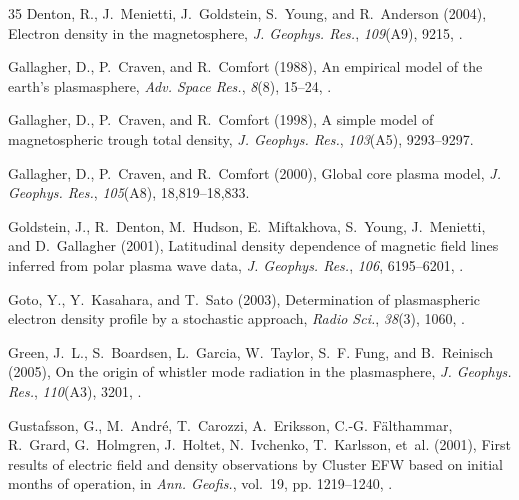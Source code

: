 \documentclass[a4paper]{article}
\renewenvironment{thebibliography}[1]{\begin{oldthebibliography}{#1}\setlength{\parskip}{0ex}\setlength{\itemsep}{0ex}}{\end{oldthebibliography}}
\begin{document}
\begin{thebibliography}{35}
Denton, R., J.~Menietti, J.~Goldstein, S.~Young, and R.~Anderson (2004),
  Electron density in the magnetosphere, \textit{J. Geophys. Res.},
  \textit{109}(A9), 9215, .

Gallagher, D., P.~Craven, and R.~Comfort (1988), An empirical model of the
  earth's plasmasphere, \textit{Adv. Space Res.}, \textit{8}(8), 15--24,
  .

Gallagher, D., P.~Craven, and R.~Comfort (1998), A simple model of
  magnetospheric trough total density, \textit{J. Geophys. Res.},
  \textit{103}(A5), 9293--9297.

Gallagher, D., P.~Craven, and R.~Comfort (2000), Global core plasma model,
  \textit{J. Geophys. Res.}, \textit{105}(A8), 18,819--18,833.

Goldstein, J., R.~Denton, M.~Hudson, E.~Miftakhova, S.~Young, J.~Menietti, and
  D.~Gallagher (2001), Latitudinal density dependence of magnetic field lines
  inferred from polar plasma wave data, \textit{J. Geophys. Res.},
  \textit{106}, 6195--6201, .

Goto, Y., Y.~Kasahara, and T.~Sato (2003), Determination of plasmaspheric
  electron density profile by a stochastic approach, \textit{Radio Sci.},
  \textit{38}(3), 1060, .

Green, J.~L., S.~Boardsen, L.~Garcia, W.~Taylor, S.~F. Fung, and B.~Reinisch
  (2005), On the origin of whistler mode radiation in the plasmasphere,
  \textit{J. Geophys. Res.}, \textit{110}(A3), 3201,
  .

Gustafsson, G., M.~Andr{\'e}, T.~Carozzi, A.~Eriksson, C.-G. F{\"a}lthammar,
  R.~Grard, G.~Holmgren, J.~Holtet, N.~Ivchenko, T.~Karlsson, et~al. (2001),
  First results of electric field and density observations by {Cluster} {EFW}
  based on initial months of operation, in \textit{Ann. Geofis.}, vol.~19, pp.
  1219--1240, .


\end{thebibliography}
\end{document}
